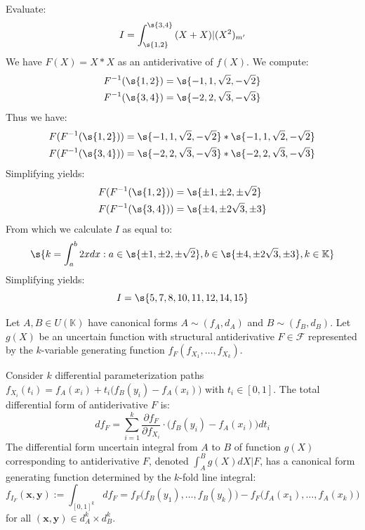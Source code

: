 \begin{example}
	Evaluate: \[I = \int_{\s{1,2}}^{\s{3,4}}{(X+X)|(X^2)_{m'}}\]
	We have $F(X) = X*X$ as an antiderivative of $f(X)$. We compute:
	\begin{align*}
		F^{-1}(\s{1,2}) &= \s{-1,1,\sqrt{2},-\sqrt{2}} \\
		F^{-1}(\s{3,4}) &= \s{-2,2,\sqrt{3},-\sqrt{3}}
	\end{align*}
	Thus we have: 
	\begin{align*}
		F(F^{-1}(\s{1,2})) &= \s{-1,1,\sqrt{2},-\sqrt{2}} * \s{-1,1,\sqrt{2},-\sqrt{2}} \\
		F(F^{-1}(\s{3,4})) &= \s{-2,2,\sqrt{3},-\sqrt{3}} * \s{-2,2,\sqrt{3},-\sqrt{3}}
	\end{align*}
	Simplifying yields:
	\begin{align*}
		F(F^{-1}(\s{1,2})) &= \s{\pm 1, \pm 2, \pm \sqrt{2}} \\
		F(F^{-1}(\s{3,4})) &= \s{\pm 4, \pm 2\sqrt{3}, \pm 3}
	\end{align*}
	From which we calculate $I$ as equal to:
	$$
		 \s{k = \int_{a}^{b}{2xdx}: a \in \s{\pm 1, \pm 2, \pm \sqrt{2}}, b \in \s{\pm 4, \pm 2\sqrt{3}, \pm 3}, k \in \mathbb{K}}
	$$
	Simplifying yields:
	\[I = \s{5, 7, 8, 10, 11, 12, 14, 15}\]
\end{example}
\begin{theorem}
	Let $A, B \in U(\mathbb{K})$ have canonical forms $A \sim (f_A, d_A)$ and $B \sim (f_B, d_B)$. Let $g(X)$ be an uncertain function with structural antiderivative $F \in \mathcal{F}$ represented by the $k$-variable generating function $f_F(f_{X_1}, \dots, f_{X_k})$.
	
	Consider $k$ differential parameterization paths $f_{X_i}(t_i) = f_A(x_i) + t_i\big(f_B(y_i) - f_A(x_i)\big)$ with $t_i \in [0, 1]$. The total differential form of antiderivative $F$ is:
	\[
	d f_F = \sum_{i=1}^{k} \frac{\partial f_F}{\partial f_{X_i}} \cdot \big(f_B(y_i) - f_A(x_i)\big) dt_i
	\]
	The differential form uncertain integral from $A$ to $B$ of function $g(X)$ corresponding to antiderivative $F$, denoted $\int_A^B g(X)dX \Big| F$, has a canonical form generating function determined by the $k$-fold line integral:
	\[
	f_{I_F}(\mathbf{x}, \mathbf{y}) := \int_{[0, 1]^k} d f_F = f_F\big(f_B(y_1), \dots, f_B(y_k)\big) - f_F\big(f_A(x_1), \dots, f_A(x_k)\big)
	\]
	for all $(\mathbf{x}, \mathbf{y}) \in d_A^k \times d_B^k$.
\end{theorem}

